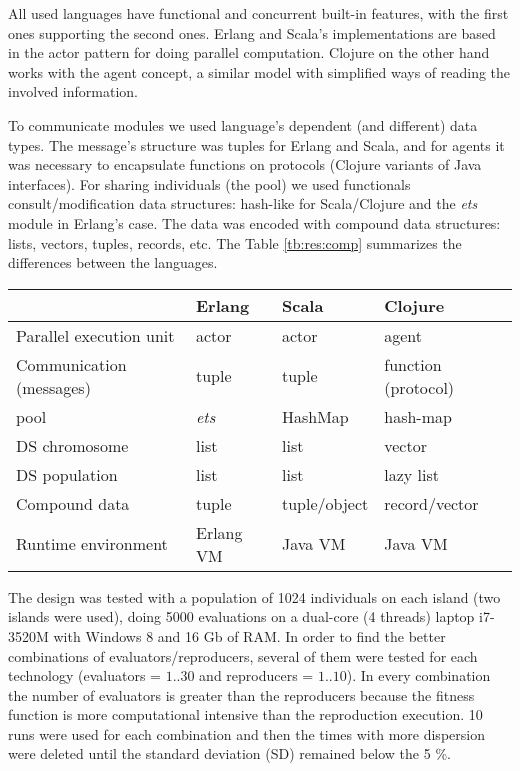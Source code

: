 
All used languages have functional and concurrent built-in features, with the first ones supporting the second ones. Erlang and Scala’s implementations are based in the actor pattern for doing parallel computation. Clojure on the other hand works with the agent concept, a similar model with simplified ways of reading the involved information.

To communicate modules we used language’s dependent (and different) data types.
The message's structure was tuples for Erlang and Scala, and for agents it was necessary to encapsulate functions on protocols (Clojure variants of Java interfaces). For sharing individuals (the pool) we used functionals consult/modification data structures: hash-like for Scala/Clojure and the {\em ets} module in Erlang’s case. The data was encoded with compound data structures: lists, vectors, tuples, records, etc. The Table \ref{tb:res:comp} summarizes the differences between the languages.

\begin{table*}\small
  \caption{Language concept used for each pGA component.}\label{tb:res:comp}
  \centering
  \begin{tabular}{|>{\centering\arraybackslash}p{4cm}|>{\centering\arraybackslash}p{2.4cm}|>{\centering\arraybackslash}p{2.4cm}|>{\centering\arraybackslash}p{3cm}|}    \hline
     & \textbf{Erlang} & \textbf{Scala} & \textbf{Clojure} \tabularnewline
    \hline
    Parallel execution unit & actor & actor & agent \tabularnewline
    \hline
    Communication (messages) & tuple & tuple & function (protocol) \tabularnewline
    \hline
    pool & \emph{ets} & HashMap & hash-map \tabularnewline
    \hline
    DS chromosome & list & list & vector \tabularnewline
    \hline
    DS population & list & list & lazy list \tabularnewline
    \hline
    Compound data & tuple & tuple/object & record/vector \tabularnewline
    \hline
    Runtime environment & Erlang VM & Java VM & Java VM \tabularnewline
    \hline
  \end{tabular}

\end{table*}



The design was tested with a population of 1024 individuals on each island (two islands were used), doing 5000 evaluations on a dual-core (4 threads) laptop  i7-3520M with Windows 8 and 16 Gb of RAM. In order to find the better combinations of evaluators/reproducers, several of them were tested for each technology (evaluators = $1..30$ and reproducers = $1..10$). In every combination the number of evaluators is greater than the reproducers because the fitness function is more computational intensive than the reproduction execution. 10 runs were used for each combination and then the times with more dispersion were deleted until the standard deviation (SD) remained below the 5 \%.

